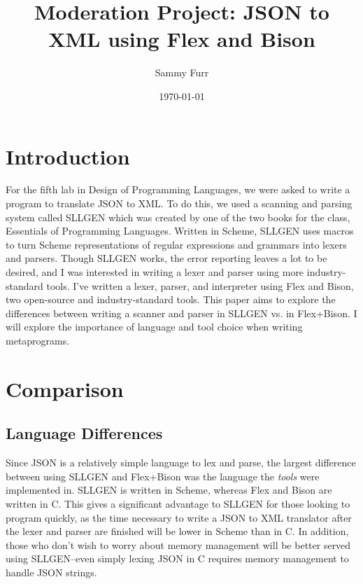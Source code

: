 \documentclass[12pt]{article}
\author{Sammy Furr}
\title{Moderation Project: JSON to XML using Flex and Bison}
\date{\today}
\begin{document}
\begin{titlepage}
\maketitle
\end{titlepage}
\section{Introduction}
For the fifth lab in Design of Programming Languages, we were asked to
write a program to translate JSON to XML.  To do this, we used a
scanning and parsing system called SLLGEN which was created by one of
the two books for the class, Essentials of Programming
Languages.\cite[pg. 379]{eopl} Written in Scheme, SLLGEN uses macros
to turn Scheme representations of regular expressions and grammars
into lexers and parsers.  Though SLLGEN works, the error reporting
leaves a lot to be desired, and I was interested in writing a lexer
and parser using more industry-standard tools.  I've written a lexer,
parser, and interpreter using Flex and Bison, two open-source and
industry-standard tools.  This paper aims to explore the differences
between writing a scanner and parser in SLLGEN vs. in Flex+Bison.  I
will explore the importance of language and tool choice when writing
metaprograms.
\section{Comparison}
\subsection{Language Differences}
Since JSON is a relatively simple language to lex and parse, the
largest difference between using SLLGEN and Flex+Bison was the
language the \textit{tools} were implemented in.  SLLGEN is written in
Scheme, whereas Flex and Bison are written in C.  This gives a
significant advantage to SLLGEN for those looking to program quickly,
as the time necessary to write a JSON to XML translator after the
lexer and parser are finished will be lower in Scheme than in C.  In
addition, those who don't wish to worry about memory management will
be better served using SLLGEN--even simply lexing JSON in C requires
memory management to handle JSON strings.
\end{document}
